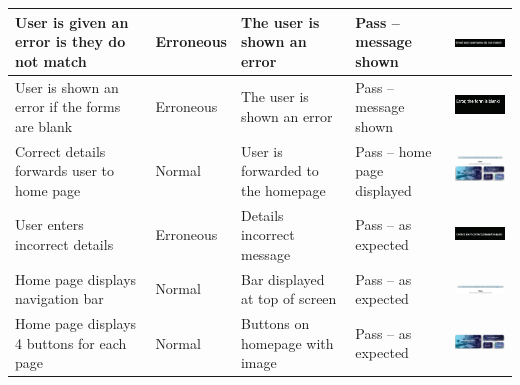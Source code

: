 \begin{center}
\begin{longtable}{|P{23mm}|P{20mm}|P{19mm}|P{20mm}|P{54mm}|}
User is given an error is they do not match & Erroneous & The user is
shown an error & Pass -- message shown &
\includegraphics[width=51mm]{ch4_testing_for_eval/media/image14.png} \\ \hline
User is shown an error if the forms are blank & Erroneous & The user is
shown an error & Pass -- message shown &
\includegraphics[width=51mm]{ch4_testing_for_eval/media/image15.png} \\ \hline
Correct details forwards user to home page & Normal & User is forwarded
to the homepage & Pass -- home page displayed &
\includegraphics[width=51mm]{ch4_testing_for_eval/media/image16.png} \\ \hline
User enters incorrect details & Erroneous & Details incorrect message &
Pass -- as expected &
\includegraphics[width=51mm]{ch4_testing_for_eval/media/image17.png} \\ \hline
Home page displays navigation bar & Normal & Bar displayed at top of
screen & Pass -- as expected &
\includegraphics[width=51mm]{ch4_testing_for_eval/media/image18.png} \\ \hline
Home page displays 4 buttons for each page & Normal & Buttons on
homepage with image & Pass -- as expected &
\includegraphics[width=51mm]{ch4_testing_for_eval/media/image19.png} \\ \hline

\end{longtable}
\end{center}
